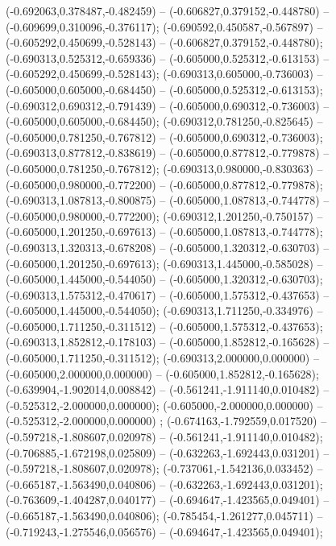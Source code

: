  (-0.692063,0.378487,-0.482459) -- (-0.606827,0.379152,-0.448780) -- (-0.609699,0.310096,-0.376117);
 (-0.690592,0.450587,-0.567897) -- (-0.605292,0.450699,-0.528143) -- (-0.606827,0.379152,-0.448780);
 (-0.690313,0.525312,-0.659336) -- (-0.605000,0.525312,-0.613153) -- (-0.605292,0.450699,-0.528143);
 (-0.690313,0.605000,-0.736003) -- (-0.605000,0.605000,-0.684450) -- (-0.605000,0.525312,-0.613153);
 (-0.690312,0.690312,-0.791439) -- (-0.605000,0.690312,-0.736003) -- (-0.605000,0.605000,-0.684450);
 (-0.690312,0.781250,-0.825645) -- (-0.605000,0.781250,-0.767812) -- (-0.605000,0.690312,-0.736003);
 (-0.690313,0.877812,-0.838619) -- (-0.605000,0.877812,-0.779878) -- (-0.605000,0.781250,-0.767812);
 (-0.690313,0.980000,-0.830363) -- (-0.605000,0.980000,-0.772200) -- (-0.605000,0.877812,-0.779878);
 (-0.690313,1.087813,-0.800875) -- (-0.605000,1.087813,-0.744778) -- (-0.605000,0.980000,-0.772200);
 (-0.690312,1.201250,-0.750157) -- (-0.605000,1.201250,-0.697613) -- (-0.605000,1.087813,-0.744778);
 (-0.690313,1.320313,-0.678208) -- (-0.605000,1.320312,-0.630703) -- (-0.605000,1.201250,-0.697613);
 (-0.690313,1.445000,-0.585028) -- (-0.605000,1.445000,-0.544050) -- (-0.605000,1.320312,-0.630703);
 (-0.690313,1.575312,-0.470617) -- (-0.605000,1.575312,-0.437653) -- (-0.605000,1.445000,-0.544050);
 (-0.690313,1.711250,-0.334976) -- (-0.605000,1.711250,-0.311512) -- (-0.605000,1.575312,-0.437653);
 (-0.690313,1.852812,-0.178103) -- (-0.605000,1.852812,-0.165628) -- (-0.605000,1.711250,-0.311512);
 (-0.690313,2.000000,0.000000) -- (-0.605000,2.000000,0.000000) -- (-0.605000,1.852812,-0.165628);
 (-0.639904,-1.902014,0.008842) -- (-0.561241,-1.911140,0.010482) -- (-0.525312,-2.000000,0.000000);
 (-0.605000,-2.000000,0.000000) -- (-0.525312,-2.000000,0.000000) ;
 (-0.674163,-1.792559,0.017520) -- (-0.597218,-1.808607,0.020978) -- (-0.561241,-1.911140,0.010482);
 (-0.706885,-1.672198,0.025809) -- (-0.632263,-1.692443,0.031201) -- (-0.597218,-1.808607,0.020978);
 (-0.737061,-1.542136,0.033452) -- (-0.665187,-1.563490,0.040806) -- (-0.632263,-1.692443,0.031201);
 (-0.763609,-1.404287,0.040177) -- (-0.694647,-1.423565,0.049401) -- (-0.665187,-1.563490,0.040806);
 (-0.785454,-1.261277,0.045711) -- (-0.719243,-1.275546,0.056576) -- (-0.694647,-1.423565,0.049401);
